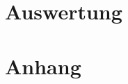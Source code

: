 \documentclass[numbers=noenddot,a4paper,notitlepage,twoside,BCOR15mm]{scrartcl}
\begin{document}
	\clearpage
	\section{Auswertung}
	
	\clearpage
	\section{Anhang}



\end{document}
